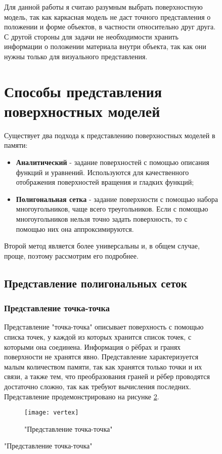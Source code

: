 \begin{figure}[h]
Для данной работы я считаю разумным выбрать поверхностную модель, так как каркасная модель не даст точного представления о положении и форме объектов, в частности относительно друг друга. С другой стороны для задачи не необходимости хранить информации о положении материала внутри объекта, так как они нужны только для визуального представления.

\section{Способы представления поверхностных моделей}
Существует два подхода к представлению поверхностных моделей в памяти:
\begin{itemize}
	\item \textbf{Аналитический} - задание поверхностей с помощью описания функций и уравнений. Используются для качественного отображения поверхностей вращения и гладких функций;
	\item \textbf{Полигональная сетка} - задание поверхности с помощью набора многоугольников, чаще всего треугольников. Если с помощью многоугольников нельзя точно задать поверхность, то с помощью них она аппроксимируются.
\end{itemize}
Второй метод является более универсальны и, в общем случае, проще, поэтому рассмотрим его подробнее.

\subsection{Представление полигональных сеток}
\subsubsection{Представление точка-точка}
Представление "точка-точка" описывает поверхность с помощью списка точек, у каждой из которых хранится список точек, с которыми она соединена. Информация о рёбрах и гранях поверхности не хранятся явно. Представление характеризуется малым количеством памяти, так как хранятся только точки и их связи, а также тем, что преобразования граней и рёбер проводятся достаточно сложно, так как требуют вычисления последних. Представление продемонстрировано на рисунке \ref{fig:vertex-vertex}.

\begin{figure}[h]
	\centering
	\texttt{[image: vertex]}
	\caption{"Представление точка-точка"}
	\label{fig:vertex-vertex}
\end{figure}



\end{figure}
